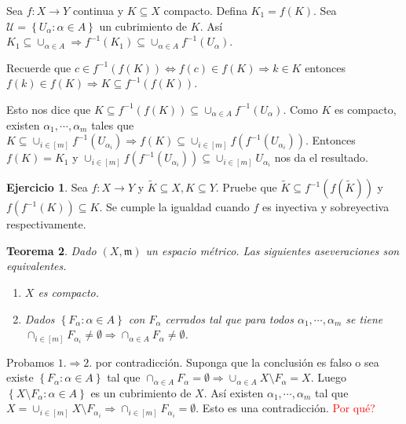 \documentclass[12pt]{article}
\theoremstyle{plain}
\newtheorem{Th}{Teorema}[subsection]   %
\theoremstyle{definition}
\newtheorem{Ej}[Th]{Ejercicio}
\theoremstyle{remark}
\numberwithin{equation}{section}
\newcommand{\mm}{\mathfrak{m}}      %
\newcommand{\cU}{\mathcal{U}}       %
\renewcommand{\:}{\colon}           %
\newcommand{\conj}[1]{\left\lbrace#1\right\rbrace}
\newcommand{\bonj}[1]{\left\lbrack#1\right\rbrack}
\begin{document}
\begin{multicols}{2}
\begin{ptcbp}
Sea $f\colon X\to Y$ continua y $K\subseteq X$ compacto. Defina $K_1=f(K)$. Sea $\cU=\conj{U_\alpha\colon\alpha\in A}$ un cubrimiento de $K$. Así $K_1\subseteq\cup_{\alpha\in A}\Rightarrow f^{-1}(K_1)\subseteq\cup_{\alpha\in A}f^{-1}(U_\alpha)$. \par
\begin{ptcb}
Recuerde que $c\in f^{-1}(f(K))\iff f(c)\in f(K)\Rightarrow k\in K$ entonces $f(k)\in f(K)\Rightarrow K\subseteq f^{-1}(f(K))$.
\end{ptcb}
Esto nos dice que $K\subseteq f^{-1}(f(K))\subseteq\cup_{\alpha\in A}f^{-1}(U_\alpha)$. Como $K$ es compacto, existen $\alpha_1,\cdots,\alpha_{m}$ tales que $K\subseteq\cup_{i\in\bonj{m}}f^{-1}(U_{\alpha_i})\Rightarrow f(K)\subseteq\cup_{i\in\bonj{m}}f(f^{-1}(U_{\alpha_i}))$. Entonces $f(K)=K_1$ y $\cup_{i\in\bonj{m}}f(f^{-1}(U_{\alpha_i}))\subseteq\cup_{i\in\bonj{m}}U_{\alpha_i}$ nos da el resultado.
\end{ptcbp}
\begin{Ej}
  Sea $f\colon X\to Y$ y $\tilde{K}\subseteq X, K\subseteq Y$. Pruebe que $\tilde{K}\subseteq f^{-1}(f(\tilde{K}))$ y $f(f^{-1}(K))\subseteq K$. Se cumple la igualdad cuando $f$ es inyectiva y sobreyectiva respectivamente.
\end{Ej}
\begin{Th}\label{intervalosEncajados}
  Dado $(X,\mm)$ un espacio métrico. Las siguientes aseveraciones son equivalentes.
  \begin{enumerate}
    \item $X$ es compacto.
    \item Dados $\conj{F_{\alpha}\colon\alpha\in A}$ con $F_\alpha$ cerrados tal que para todos $\alpha_1,\cdots,\alpha_m$ se tiene $\cap_{i\in\bonj{m}}F_{\alpha_i}\neq\emptyset\Rightarrow\cap_{\alpha\in A}F_{\alpha}\neq\emptyset$.
  \end{enumerate}
\end{Th}

\begin{ptcbp}
Probamos $\mathit{1}.\Rightarrow\mathit{2.}$ por contradicción. Suponga que la conclusión es falso o sea existe $\conj{F_\alpha\colon\alpha\in A}$ tal que $\cap_{\alpha\in A}F_\alpha=\emptyset\Rightarrow\cup_{\alpha\in A}X\setminus F_\alpha= X$. Luego $\conj{X\setminus F_\alpha\colon\alpha\in A}$ es un cubrimiento de $X$. Así existen $\alpha_1,\cdots,\alpha_m$ tal que $X=\cup_{i\in\bonj{m}}X\setminus F_{\alpha_i}\Rightarrow\cap_{i\in\bonj{m}}F_{\alpha_i}=\emptyset$. Esto es una contradicción. \textcolor{red}{Por qué?}
\end{ptcbp}


\end{multicols}
\end{document}
